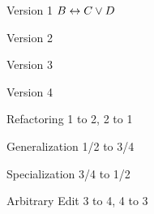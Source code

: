 \begin{frame}{\myframetitle{} }
	\begin{mycolumns}
		\begin{mycolumns}[t]
			\begin{example}{Version 1}
				\centering{}
				$B \leftrightarrow C \vee D$
			\end{example}
		\mynextcolumn
			\begin{example}{Version 2}
				\pause\centering{}
			\end{example}
		\end{mycolumns}
		\begin{mycolumns}
			\begin{example}{Version 3}
				\pause\centering{}
			\end{example}
		\mynextcolumn
			\begin{example}{Version 4}
				\pause\centering{}
			\end{example}
		\end{mycolumns}
	\mynextcolumn
		\pause\begin{example}{Refactoring}
			1 to 2, 2 to 1
		\end{example}
		\pause\begin{example}{Generalization}
			1/2 to 3/4
		\end{example}
		\pause\begin{example}{Specialization}
			3/4 to 1/2
		\end{example}
		\pause\begin{example}{Arbitrary Edit}
			3 to 4, 4 to 3
		\end{example}
	\end{mycolumns}
\end{frame}


